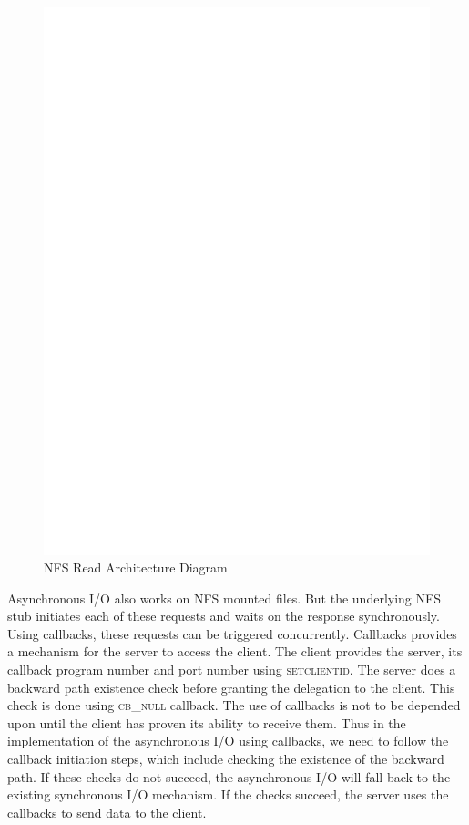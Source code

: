 \begin{figure}
\centering
\includegraphics[scale=0.7]{figures/Read.eps}
\caption{NFS Read Architecture Diagram}
\label{fig:NFSReadArch}
\end{figure}


Asynchronous I/O also works on NFS mounted files. But the underlying NFS stub initiates each of these requests and waits on the response synchronously. Using callbacks, these requests can be triggered concurrently. Callbacks provides a mechanism for the server to access the client. The client provides the server, its callback program number and port number using \textsc{setclientid}. The server does a backward path existence check before granting the delegation to the client. This check is done using \textsc{cb\_null} callback. The use of callbacks is not to be depended upon until the client has proven its ability to receive them. Thus in the implementation of the asynchronous I/O using callbacks, we need to follow the callback initiation steps, which include checking the existence of the backward path. If these checks do not succeed, the asynchronous I/O will fall back to the existing synchronous I/O mechanism. If the checks succeed, the server uses the callbacks to send data to the client.

